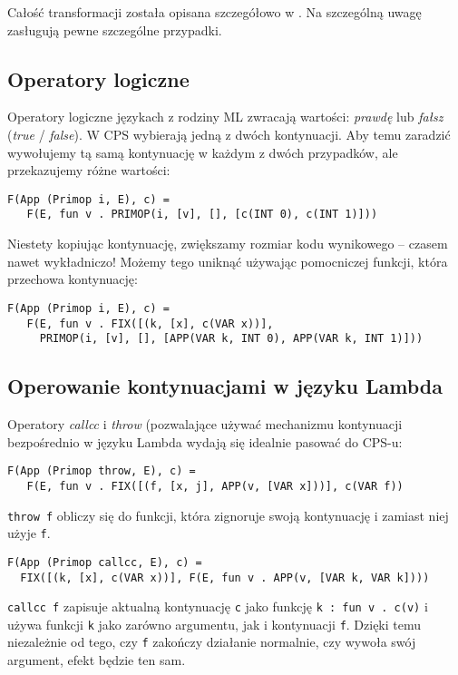 \documentclass[11pt]{scrartcl}
\begin{document}
Całość transformacji została opisana szczegółowo w \cite[Conversion into CPS]{Appel}. Na szczególną uwagę
zasługują pewne szczególne przypadki.

\subsection{Operatory logiczne}
Operatory logiczne językach z rodziny ML zwracają wartości: \textit{prawdę} lub \textit{fałsz}
(\textit{true} / \textit{false}). W CPS wybierają jedną z dwóch kontynuacji. Aby temu zaradzić
wywołujemy tą samą kontynuację w każdym z dwóch przypadków, ale przekazujemy
różne wartości:
\begin{lstlisting}
F(App (Primop i, E), c) =
   F(E, fun v . PRIMOP(i, [v], [], [c(INT 0), c(INT 1)]))
\end{lstlisting}

Niestety kopiując kontynuację, zwiększamy rozmiar kodu wynikowego -- czasem nawet
wykładniczo! Możemy tego uniknąć używając pomocniczej funkcji, która przechowa
kontynuację:
\begin{lstlisting}
F(App (Primop i, E), c) =
   F(E, fun v . FIX([(k, [x], c(VAR x))],
     PRIMOP(i, [v], [], [APP(VAR k, INT 0), APP(VAR k, INT 1)]))
\end{lstlisting}

\subsection{Operowanie kontynuacjami w języku Lambda}
Operatory \textit{callcc} i \textit{throw} (pozwalające używać mechanizmu kontynuacji bezpośrednio
w języku Lambda wydają się idealnie pasować do CPS-u:
\begin{lstlisting}
F(App (Primop throw, E), c) =
   F(E, fun v . FIX([(f, [x, j], APP(v, [VAR x]))], c(VAR f))
\end{lstlisting}
\lstinline|throw f| obliczy się do funkcji, która zignoruje swoją kontynuację i zamiast niej
użyje \lstinline|f|.

\begin{lstlisting}
F(App (Primop callcc, E), c) =
  FIX([(k, [x], c(VAR x))], F(E, fun v . APP(v, [VAR k, VAR k])))
\end{lstlisting}
\lstinline|callcc f| zapisuje aktualną kontynuację \lstinline|c| jako funkcję \lstinline|k : fun v . c(v)| i używa
funkcji \lstinline|k| jako zarówno argumentu, jak i kontynuacji \lstinline|f|. Dzięki temu niezależnie
od tego, czy \lstinline|f| zakończy działanie normalnie, czy wywoła swój argument, efekt
będzie ten sam.
\end{document}
